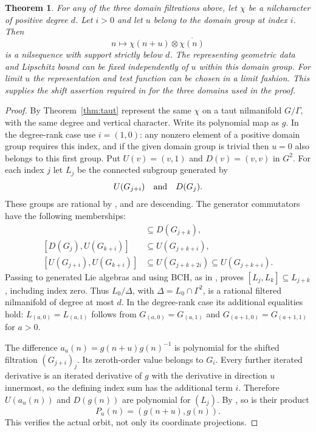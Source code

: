 \documentclass[11pt]{article}
\newtheorem{theorem}{Theorem}
\begin{document}
\begin{theorem}\label{thm:shift}
For any of the three domain filtrations above, let $\chi$ be a nilcharacter
of positive degree $d$. Let $i>0$ and let $u$ belong to the domain group at
index $i$. Then
\[
 n\longmapsto\chi(n+u)\otimes\overline{\chi(n)}
\]
is a nilsequence with support strictly below $d$. The representing geometric
data and Lipschitz bound can be fixed independently of $u$ within this
domain group. For limit $u$ the representation and test function can be
chosen in a limit fashion. This supplies the shift assertion required in
\cite[Lemma E.8(iv)]{GTZ} for the three domains used in the proof.
\end{theorem}
\begin{proof}
By Theorem~\ref{thm:taut} represent the same $\chi$ on a taut nilmanifold
$G/\Gamma$, with the same degree and vertical character. Write its
polynomial map as $g$. In the degree-rank case use $i=(1,0)$: any
nonzero element of a positive domain group requires this index, and if the
given domain group is trivial then $u=0$ also belongs to this first group.
Put $U(v)=(v,1)$ and $D(v)=(v,v)$ in $G^2$.
For each index $j$ let $L_j$ be the connected subgroup generated by
\[
 U(G_{j+i})\quad\hbox{and}\quad D(G_j).
\]
These groups are rational by \cite[Lemma 2]{LP13}, and are descending.
The generator commutators have the following memberships:
\begin{align*}
 [D(G_j),D(G_k)]&\subseteq D(G_{j+k}),\\
 [D(G_j),U(G_{k+i})]&\subseteq U(G_{j+k+i}),\\
 [U(G_{j+i}),U(G_{k+i})]&\subseteq U(G_{j+k+2i})
                                      \subseteq U(G_{j+k+i}).
\end{align*}
Passing to generated Lie algebras and using BCH, as in
\cite[Section 4]{LP13}, proves $[L_j,L_k]\subseteq L_{j+k}$, including
index zero. Thus $L_0/\Delta$, with $\Delta=L_0\cap\Gamma^2$, is a rational
filtered nilmanifold of degree at most $d$. In the degree-rank case its
additional equalities hold: $L_{(a,0)}=L_{(a,1)}$ follows from
$G_{(a,0)}=G_{(a,1)}$ and $G_{(a+1,0)}=G_{(a+1,1)}$ for $a>0$.

The difference $a_u(n)=g(n+u)g(n)^{-1}$ is polynomial for the shifted
filtration $(G_{j+i})_j$. Its zeroth-order value belongs to $G_i$.
Every further iterated derivative is an iterated derivative of $g$ with
the derivative in direction $u$ innermost, so the defining index sum has
the additional term $i$. Therefore $U(a_u(n))$ and $D(g(n))$ are polynomial
for $(L_j)$. By \cite[Corollary B.4]{GTZ}, so is their product
\[
 P_u(n)=(g(n+u),g(n)).
\]
This verifies the actual orbit, not only its coordinate projections.


\end{proof}
\end{document}
